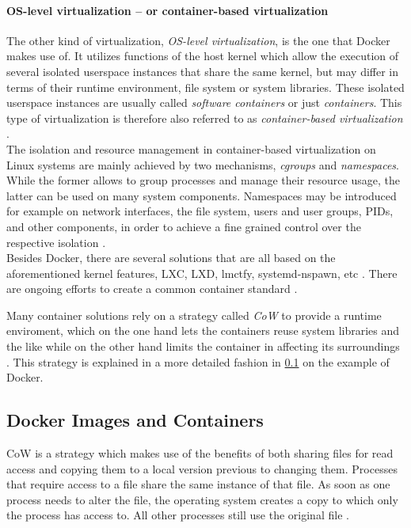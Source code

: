     \paragraph{OS-level virtualization -- or container-based virtualization} %
    \label{par:os_level_virtualization}
      The other kind of virtualization, \emph{OS-level virtualization}, is the one that Docker makes use of.
      It utilizes functions of the host kernel which allow the execution of several isolated userspace instances that share the same kernel, but may differ in terms of their runtime environment, \eg file system or system libraries. These isolated userspace instances are usually called \emph{software containers} or just \emph{containers}. This type of virtualization is therefore also referred to as \emph{container-based virtualization} \cite{Ruiz2015Performance}. \\

      The isolation and resource management in container-based virtualization on Linux systems are mainly achieved by two mechanisms, \emph{\ac{cgroups}} and \emph{namespaces}. While the former allows to group processes and manage their resource usage, the latter can be used on many system components. Namespaces may be introduced for example on network interfaces, the file system, users and user groups, \ac{PID}s, and other components, in order to achieve a fine grained control over the respective isolation \cite{Ruiz2015Performance}. \\
      Besides Docker, there are several solutions that are all based on the aforementioned kernel features, \eg LXC, LXD, lmctfy, systemd-nspawn, etc \cite{Ruiz2015Performance}. There are ongoing efforts to create a common container standard \cite{Initiative????Open}.

      Many container solutions rely on a strategy called \emph{\ac{CoW}} to provide a runtime enviroment, which on the one hand lets the containers reuse system libraries and the like while on the other hand limits the container in affecting its surroundings \cite{Docker????Dockera,Pahl2015Containerization}. This strategy is explained in a more detailed fashion in \ref{sub:docker_images_and_containers} on the example of Docker.


  \subsection{Docker Images and Containers} %
  \label{sub:docker_images_and_containers}
    \ac{CoW} is a strategy which makes use of the benefits of both sharing files for read access and copying them to a local version previous to changing them. Processes that require access to a file share the same instance of that file. As soon as one process needs to alter the file, the operating system creates a copy to which only the process has access to. All other processes still use the original file \cite{Pahl2015Containerization,Docker????Dockera}.

